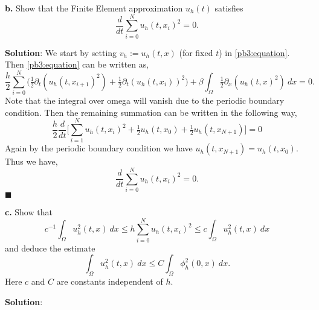 \documentclass[11pt]{article}
\begin{document}
\vskip 2cm


\textbf{b.} Show that the Finite Element approximation $u_h(t)$ satisfies
\begin{equation}
    \frac{d}{dt} \sum_{i=0}^N u_h(t,x_i)^2 = 0.
\end{equation}

\vskip 1cm

\textbf{Solution}: We start by setting $v_h := u_h(t,x)$ (for fixed $t$) in \eqref{pb3:equation}.
Then \eqref{pb3:equation} can be written as,
\begin{equation}
    \frac{h}{2} \sum_{i=0}^N \big(\tfrac{1}{2} \partial_t(u_h(t,x_{i+1})^2) + \tfrac{1}{2} \partial_t (u_h(t,x_i))^2 \big) + \beta \int_\Omega \tfrac{1}{2} \partial_x(u_h(t,x)^2) \: dx = 0.
\end{equation}
Note that the integral over omega will vanish due to the periodic boundary condition.
Then the remaining summation can be written in the following way,
\begin{equation}
    \frac{h}{2}  \frac{d}{dt} \Big[ \sum_{i=1}^{N} u_h(t,x_i)^2 + \tfrac{1}{2} u_h(t,x_0) + \tfrac{1}{2} u_h(t,x_{N+1})  \Big] = 0
\end{equation}
Again by the periodic boundary condition we have $u_h(t,x_{N+1}) = u_h(t,x_0)$. 
Thus we have, 
\begin{equation}
    \frac{d}{dt} \sum_{i=0}^N u_h(t,x_i)^2 = 0.
\end{equation}
$\blacksquare$

\vskip 2cm


\textbf{c.} Show that 
\begin{equation}
    c^{-1} \int_\Omega u^2_h(t,x) \: dx \leq h \sum_{i=0}^N u_h(t,x_i)^2 \leq c \int_\Omega u^2_h(t,x) \: dx
\end{equation}
and deduce the estimate 
\begin{equation}
    \int_\Omega u^2_h(t,x) \: dx \leq C\int_\Omega \phi^2_h(0,x) \: dx.
\end{equation}
Here $c$ and $C$ are constants independent of $h$.

\vskip 1cm

\textbf{Solution}: 

\vskip 2cm
\end{document}
